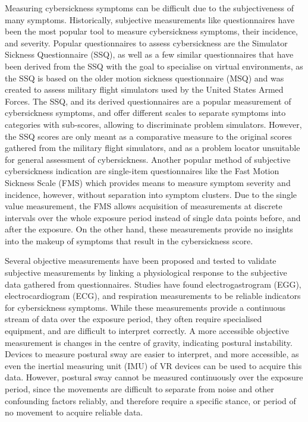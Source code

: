 Measuring cybersickness symptoms can be difficult due to the subjectiveness of many symptoms.
Historically, subjective measurements like questionnaires have been the most popular tool to measure cybersickness
symptoms, their incidence, and severity.
Popular questionnaires to assess cybersickness are the Simulator Sickness Questionnaire (SSQ), as well as a few
similar questionnaires that have been derived from the SSQ with the goal to specialise on virtual environments, as
the SSQ is based on the older motion sickness questionnaire (MSQ) and was created to assess military flight
simulators used by the United States Armed Forces.
The SSQ, and its derived questionnaires are a popular measurement of cybersickness symptoms, and offer different
scales to separate symptoms into categories with sub-scores, allowing to discriminate problem simulators.
However, the SSQ scores are only meant as a comparative measure to the original scores gathered from the military
flight simulators, and as a problem locator unsuitable for general assessment of cybersickness.
Another popular method of subjective cybersickness indication are single-item questionnaires like the Fast Motion
Sickness Scale (FMS) which provides means to measure symptom severity and incidence, however, without separation into
symptom clusters.
Due to the single value measurement, the FMS allows acquisition of measurements at discrete intervals over the whole
exposure period instead of single data points before, and after the exposure.
On the other hand, these measurements provide no insights into the makeup of symptoms that result in the
cybersickness score.

Several objective measurements have been proposed and tested to validate subjective measurements by linking a
physiological response to the subjective data gathered from questionnaires.
Studies have found electrogastrogram (EGG), electrocardiogram (ECG), and respiration measurements to be reliable
indicators for cybersickness symptoms.
While these measurements provide a continuous stream of data over the exposure period, they often require specialised
equipment, and are difficult to interpret correctly.
A more accessible objective measurement is changes in the centre of gravity, indicating postural instability.
Devices to measure postural sway are easier to interpret, and more accessible, as even the inertial measuring unit
(IMU) of VR devices can be used to acquire this data.
However, postural sway cannot be measured continuously over the exposure period, since the movements are difficult to
separate from noise and other confounding factors reliably, and therefore require a specific stance, or period of no
movement to acquire reliable data.

